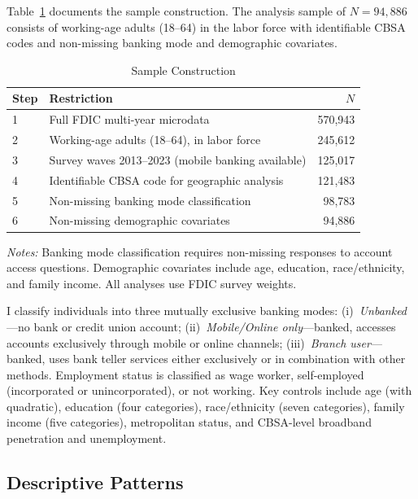 \documentclass[12pt]{article}
\begin{document}
Table~\ref{tab:sample_flow} documents the sample construction. The analysis sample of $N = 94{,}886$ consists of working-age adults (18--64) in the labor force with identifiable CBSA codes and non-missing banking mode and demographic covariates.

\begin{table}[H]
\centering
\caption{Sample Construction}
\label{tab:sample_flow}
\begin{threeparttable}
\begin{tabular}{llr}
\toprule
Step & Restriction & $N$ \\
\midrule
1 & Full FDIC multi-year microdata & 570,943 \\
2 & Working-age adults (18--64), in labor force & 245,612 \\
3 & Survey waves 2013--2023 (mobile banking available) & 125,017 \\
4 & Identifiable CBSA code for geographic analysis & 121,483 \\
5 & Non-missing banking mode classification & 98,783 \\
6 & Non-missing demographic covariates & 94,886 \\
\bottomrule
\end{tabular}
\begin{tablenotes}
\small
\item \textit{Notes:} Banking mode classification requires non-missing responses to account access questions. Demographic covariates include age, education, race/ethnicity, and family income. All analyses use FDIC survey weights.
\end{tablenotes}
\end{threeparttable}
\end{table}

I classify individuals into three mutually exclusive banking modes: (i)~\textit{Unbanked}---no bank or credit union account; (ii)~\textit{Mobile/Online only}---banked, accesses accounts exclusively through mobile or online channels; (iii)~\textit{Branch user}---banked, uses bank teller services either exclusively or in combination with other methods. Employment status is classified as wage worker, self-employed (incorporated or unincorporated), or not working. Key controls include age (with quadratic), education (four categories), race/ethnicity (seven categories), family income (five categories), metropolitan status, and CBSA-level broadband penetration and unemployment.

\subsection{Descriptive Patterns}
\label{subsec:descriptive}
\end{document}
